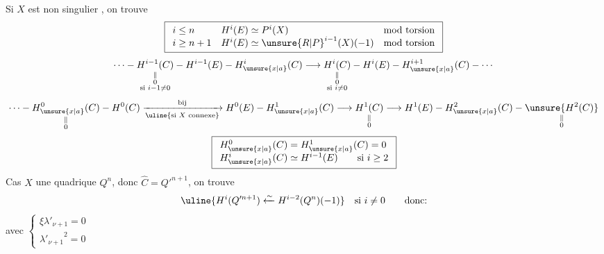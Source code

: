 Si $X$ est non singulier , on trouve
\[
\boxed{\begin{array}{lll}
i\le n&H^i(E)\simeq P^i(X)&\text{mod torsion}\\
i\ge n+1&H^i(E)\simeq\unsure{R|P}^{i-1}(X)(-1)&\text{mod torsion}
\end{array}}
\]
\[
\cdots\mathbin{-}
\underset{\substack{\Vert\\0\\\text{si }i-1\ne0}}{H^{i-1}(C)}
\mathbin{-}H^{i-1}(E)\mathbin{-}H^i_{\unsure{x|a}}(C)
\longrightarrow
\underset{\substack{\Vert\\0\\\text{si }i\ne0}}{H^i(C)}
\mathbin{-}H^i(E)\mathbin{-}H^{i+1}_{\unsure{x|a}}(C)\mathbin{-}\cdots
\]
\[
\cdots\mathbin{-}\underset{\substack{\Vert\\0}}{H^0_{\unsure{x|a}}(C)}
\mathbin{-}H^0(C)
\xrightarrow[\uline{\text{si }X\text{ connexe}}]{\text{bij}}
H^0(E)\mathbin{-}H^1_{\unsure{x|a}}(C)
\longrightarrow\underset{\substack{\Vert\\0}}{H^1(C)}
\longrightarrow H^1(E)\mathbin{-}H^2_{\unsure{x|a}}(C)
\mathbin{-}\underset{\substack{\Vert\\0}}{\unsure{H^2(C)}}
\]
\[
\boxed{\begin{array}{l}
H^0_{\unsure{x|a}}(C)=H^1_{\unsure{x|a}}(C)=0\\
H^i_{\unsure{x|a}}(C)\simeq H^{i-1}(E)\qquad\text{si }i\ge2
\end{array}}
\]
Cas $X$ une quadrique $Q^n$, donc $\hat C=Q'^{n+1}$, on trouve
\[
\uline{H^i(Q'^{n+1})\xleftarrow{\sim}H^{i-2}(Q^n)(-1)}
\quad\text{si }i\ne0\qquad\text{donc:}
\]
\diagram{\[
\left|\begin{array}{ll}
\left(1,\xi,\ldots,\xi^\nu,\frac12\xi^{\nu+1},\ldots,\frac12\xi^{2\nu}\right)
&\text{si }\boxed{n+1=2\nu}\\[6pt]
\left(1,\xi,\ldots,\xi^\nu,[\xi^{\nu+1},\lambda'_{\nu+1}],
\frac12\xi^{\nu+2},\ldots,\frac12\xi^{2\nu+1}\right)
&\text{si }\boxed{n+1=2\nu+1}
\end{array}\right.
\]}
avec $\left\{\begin{array}{l}\xi\lambda'_{\nu+1}=0\\{\lambda'_{\nu+1}}^2=0\end{array}\right.$
